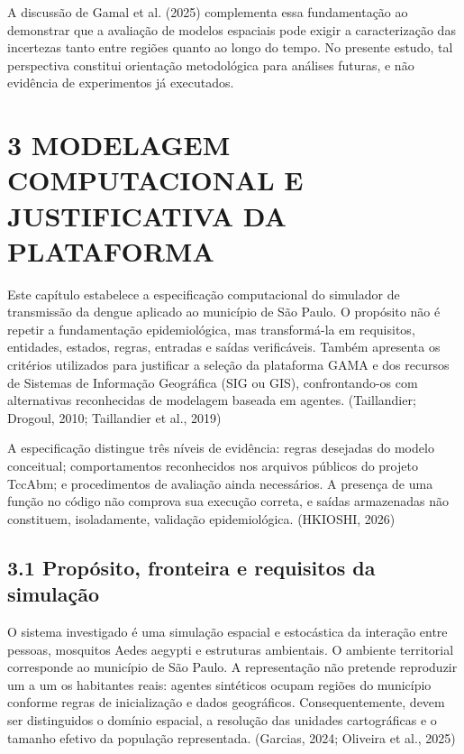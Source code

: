 A discussão de Gamal et al. (2025) complementa essa fundamentação ao
demonstrar que a avaliação de modelos espaciais pode exigir a
caracterização das incertezas tanto entre regiões quanto ao longo do
tempo. No presente estudo, tal perspectiva constitui orientação
metodológica para análises futuras, e não evidência de experimentos já
executados.

\section{3 MODELAGEM COMPUTACIONAL E JUSTIFICATIVA DA
PLATAFORMA}\label{modelagem-computacional-e-justificativa-da-plataforma}

Este capítulo estabelece a especificação computacional do simulador de
transmissão da dengue aplicado ao município de São Paulo. O propósito
não é repetir a fundamentação epidemiológica, mas transformá-la em
requisitos, entidades, estados, regras, entradas e saídas verificáveis.
Também apresenta os critérios utilizados para justificar a seleção da
plataforma GAMA e dos recursos de Sistemas de Informação Geográfica (SIG
ou GIS), confrontando-os com alternativas reconhecidas de modelagem
baseada em agentes. (Taillandier; Drogoul, 2010; Taillandier et al.,
2019)

A especificação distingue três níveis de evidência: regras desejadas do
modelo conceitual; comportamentos reconhecidos nos arquivos públicos do
projeto TccAbm; e procedimentos de avaliação ainda necessários. A
presença de uma função no código não comprova sua execução correta, e
saídas armazenadas não constituem, isoladamente, validação
epidemiológica. (HKIOSHI, 2026)

\subsection{3.1 Propósito, fronteira e requisitos da
simulação}\label{propuxf3sito-fronteira-e-requisitos-da-simulauxe7uxe3o}

O sistema investigado é uma simulação espacial e estocástica da
interação entre pessoas, mosquitos Aedes aegypti e estruturas
ambientais. O ambiente territorial corresponde ao município de São
Paulo. A representação não pretende reproduzir um a um os habitantes
reais: agentes sintéticos ocupam regiões do município conforme regras de
inicialização e dados geográficos. Consequentemente, devem ser
distinguidos o domínio espacial, a resolução das unidades cartográficas
e o tamanho efetivo da população representada. (Garcias, 2024; Oliveira
et al., 2025)

